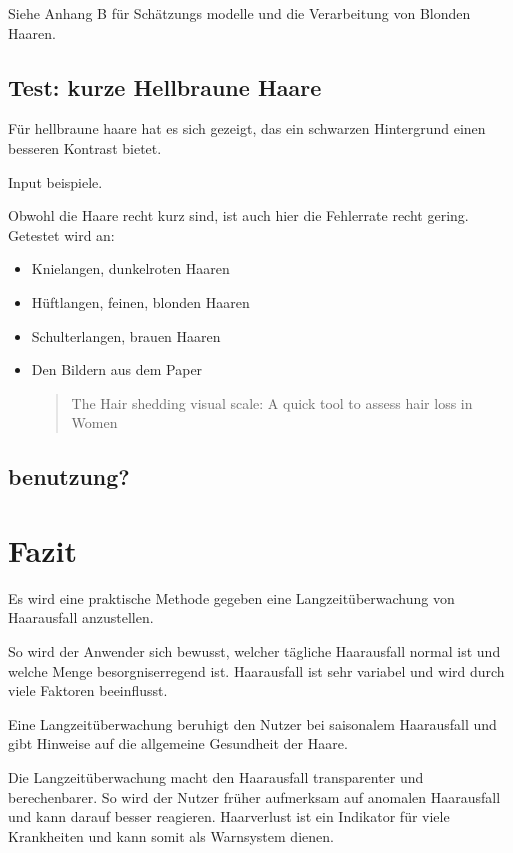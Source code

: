 \documentclass[german,a4paper,12pt,smallheadings,headsepline, titlepage, liststotoc, idextotoc,bibtoctoc,blibliography = totocnumbered]{scrartcl}
\begin{document}
Siehe Anhang B für Schätzungs modelle und die Verarbeitung von Blonden Haaren.

\subsection{Test: kurze Hellbraune Haare}

Für hellbraune haare hat es sich gezeigt, das ein schwarzen Hintergrund einen besseren Kontrast bietet.

Input beispiele.

Obwohl die Haare recht kurz sind, ist auch hier die Fehlerrate recht gering. 
Getestet wird an:
\begin{itemize}
	\item Knielangen, dunkelroten Haaren
	\item Hüftlangen, feinen, blonden Haaren
	\item Schulterlangen, brauen Haaren
	\item Den Bildern aus dem Paper \blockquote{The Hair shedding visual scale: A quick tool to assess hair loss in Women} 
\end{itemize}

\subsection{benutzung?}

\section{Fazit}
Es wird eine praktische Methode gegeben eine Langzeitüberwachung von Haarausfall anzustellen. 

So wird der Anwender sich bewusst, welcher tägliche Haarausfall normal ist und welche Menge besorgniserregend ist. Haarausfall ist sehr variabel und wird durch viele Faktoren beeinflusst. 

Eine Langzeitüberwachung beruhigt den Nutzer bei saisonalem Haarausfall und gibt Hinweise auf die allgemeine Gesundheit der Haare. 

Die Langzeitüberwachung macht den Haarausfall transparenter und berechenbarer. So wird der Nutzer früher aufmerksam auf anomalen Haarausfall und kann darauf besser reagieren. Haarverlust ist ein Indikator für viele Krankheiten und kann somit als Warnsystem dienen.


\end{document}
